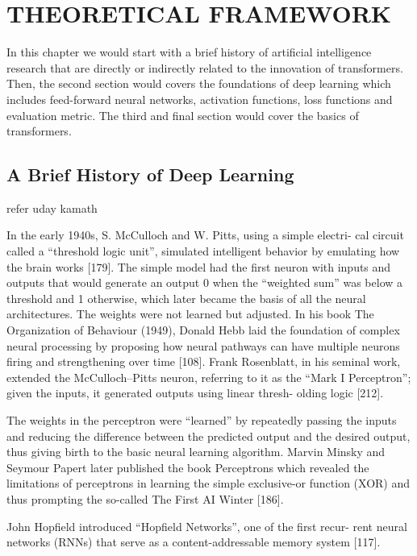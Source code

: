 \chapter{THEORETICAL FRAMEWORK}
\label{chap: 3}

In this chapter we would start with a brief history of artificial intelligence research that are directly or indirectly related to the innovation of transformers. Then, the second section would covers the foundations of deep learning which includes feed-forward neural networks, activation functions, loss functions and evaluation metric. The third and final section would cover the basics of transformers.

\section{A Brief History of Deep Learning}

refer uday kamath


In the early 1940s, S. McCulloch and W. Pitts, using a simple electri-
cal circuit called a “threshold logic unit”, simulated intelligent behavior
by emulating how the brain works [179]. The simple model had the
first neuron with inputs and outputs that would generate an output 0
when the “weighted sum” was below a threshold and 1 otherwise, which
later became the basis of all the neural architectures. The weights were
not learned but adjusted. In his book The Organization of Behaviour
(1949), Donald Hebb laid the foundation of complex neural processing by proposing how neural pathways can have multiple neurons firing and
strengthening over time [108]. Frank Rosenblatt, in his seminal work,
extended the McCulloch–Pitts neuron, referring to it as the “Mark I
Perceptron”; given the inputs, it generated outputs using linear thresh-
olding logic [212].

The weights in the perceptron were “learned” by repeatedly passing
the inputs and reducing the difference between the predicted output
and the desired output, thus giving birth to the basic neural learning
algorithm. Marvin Minsky and Seymour Papert later published the book
Perceptrons which revealed the limitations of perceptrons in learning the
simple exclusive-or function (XOR) and thus prompting the so-called
The First AI Winter [186].

John Hopfield introduced “Hopfield Networks”, one of the first recur-
rent neural networks (RNNs) that serve as a content-addressable memory
system [117].

